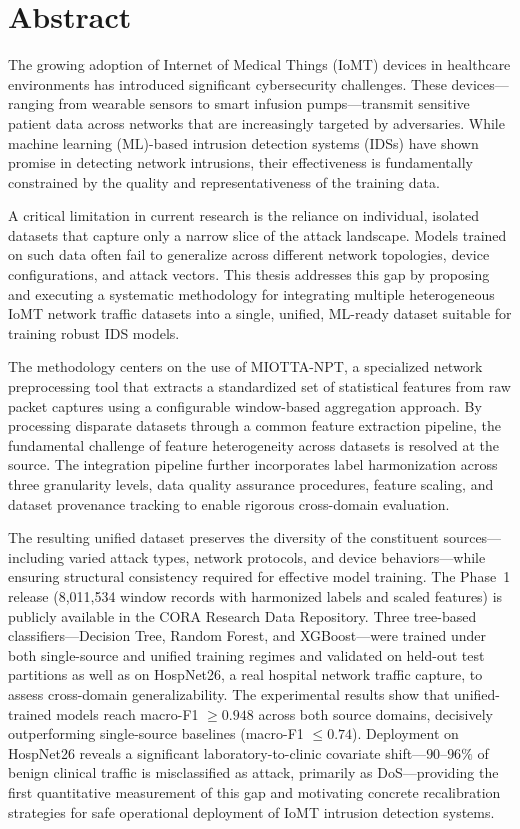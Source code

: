 
\chapter*{Abstract}

The growing adoption of Internet of Medical Things (IoMT) devices in healthcare environments has introduced significant cybersecurity challenges. These devices---ranging from wearable sensors to smart infusion pumps---transmit sensitive patient data across networks that are increasingly targeted by adversaries. While machine learning (ML)-based intrusion detection systems (IDSs) have shown promise in detecting network intrusions, their effectiveness is fundamentally constrained by the quality and representativeness of the training data.

A critical limitation in current research is the reliance on individual, isolated datasets that capture only a narrow slice of the attack landscape. Models trained on such data often fail to generalize across different network topologies, device configurations, and attack vectors. This thesis addresses this gap by proposing and executing a systematic methodology for integrating multiple heterogeneous IoMT network traffic datasets into a single, unified, ML-ready dataset suitable for training robust IDS models.

The methodology centers on the use of MIOTTA-NPT, a specialized network preprocessing tool that extracts a standardized set of statistical features from raw packet captures using a configurable window-based aggregation approach. By processing disparate datasets through a common feature extraction pipeline, the fundamental challenge of feature heterogeneity across datasets is resolved at the source. The integration pipeline further incorporates label harmonization across three granularity levels, data quality assurance procedures, feature scaling, and dataset provenance tracking to enable rigorous cross-domain evaluation.

The resulting unified dataset preserves the diversity of the constituent sources---including varied attack types, network protocols, and device behaviors---while ensuring structural consistency required for effective model training. The Phase~1 release (8,011,534 window records with harmonized labels and scaled features) is publicly available in the CORA Research Data Repository. Three tree-based classifiers---Decision Tree, Random Forest, and XGBoost---were trained under both single-source and unified training regimes and validated on held-out test partitions as well as on HospNet26, a real hospital network traffic capture, to assess cross-domain generalizability. The experimental results show that unified-trained models reach macro-F1 $\geq 0.948$ across both source domains, decisively outperforming single-source baselines (macro-F1 $\leq 0.74$). Deployment on HospNet26 reveals a significant laboratory-to-clinic covariate shift---$90$--$96\%$ of benign clinical traffic is misclassified as attack, primarily as DoS---providing the first quantitative measurement of this gap and motivating concrete recalibration strategies for safe operational deployment of IoMT intrusion detection systems.

